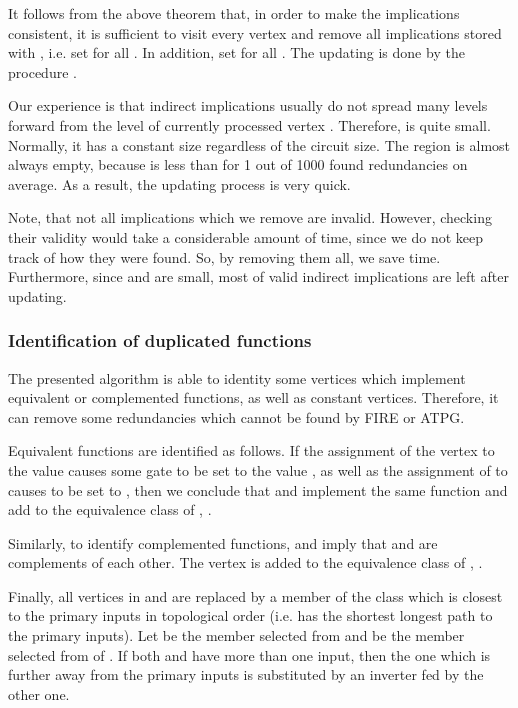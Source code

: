 \documentclass[conference]{IEEEtran} \usepackage{times}
\begin{document}
It follows from the above theorem that, in order to make the implications
consistent, it is sufficient to visit every vertex  and
remove all implications stored with , i.e. set
 for all .  In addition, 
set  for all .
The updating is done by the procedure .

Our experience is that indirect implications usually do not spread
many levels forward from the level of currently processed vertex
. Therefore,  is quite small. Normally, it has a
constant size regardless of the circuit size.  The region  is
almost always empty, because  is less than 
for 1 out of 1000 found redundancies on average. As a result, the
updating process is very quick.

Note, that not all implications which we remove are invalid.  However,
checking their validity would take a considerable amount of time, since
 we do not keep track of how they were found. So, by removing them all, we
save time. Furthermore, since  and  are small, 
most of valid indirect implications are left after updating.

\subsubsection{Identification of duplicated functions} \label{q2}

The presented algorithm is able to identity some vertices which implement equivalent
or complemented functions, as well as constant vertices.  Therefore,
it can remove some redundancies which cannot be found by FIRE or ATPG.

Equivalent functions are identified as follows.
If the assignment of the vertex  to the value  causes some gate
 to be set to the value , as well as the assignment of  to
 causes  to be set to , then
we conclude that  and  implement the same function and
add  to the equivalence class of , .

Similarly, to identify complemented functions, 
 and
 imply that  and
 are complements of each other.  The vertex  is added to the equivalence
class of , .

Finally, all vertices in  and  are
replaced by a member of the class which is closest to the primary
inputs in topological order (i.e. has the shortest longest path to the
primary inputs). Let  be the member selected from  and
 be the member selected from of . If both
 and  have more than one input, then the one which is further
away from the primary inputs is substituted by an inverter fed by the
other one.
\end{document}
